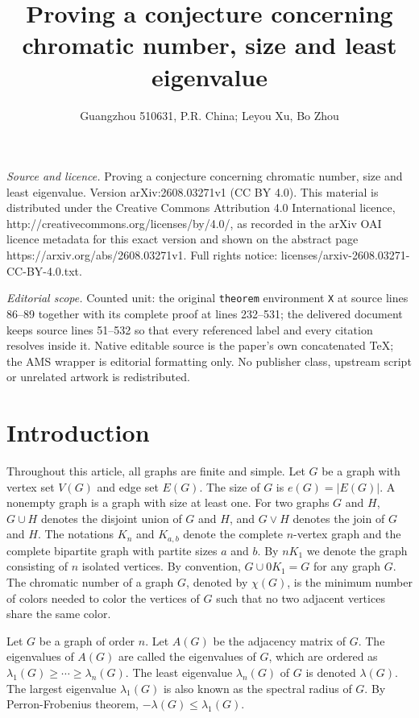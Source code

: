 \documentclass[10pt,a4paper]{amsart}
\begin{document}
\title[Proving a conjecture concerning chromatic number, size and l]{Proving a conjecture concerning chromatic number, size and least eigenvalue}
\author{Guangzhou 510631, P.R. China; Leyou Xu, Bo Zhou}
\date{}
\maketitle
\noindent\emph{Source and licence.} Proving a conjecture concerning chromatic number, size and least eigenvalue. Version arXiv:2608.03271v1 (CC BY 4.0). This material is distributed under the Creative Commons Attribution 4.0 International licence, http://creativecommons.org/licenses/by/4.0/, as recorded in the arXiv OAI licence metadata for this exact version and shown on the abstract page https://arxiv.org/abs/2608.03271v1. Full rights notice: licenses/arxiv-2608.03271-CC-BY-4.0.txt.\par\smallskip
\noindent\textit{Editorial scope.} Counted unit: the original \texttt{theorem} environment \texttt{X} at source lines 86--89 together with its complete proof at lines 232--531; the delivered document keeps source lines 51--532 so that every referenced label and every citation resolves inside it. Native editable source is the paper's own concatenated TeX; the AMS wrapper is editorial formatting only. No publisher class, upstream script or unrelated artwork is redistributed.
\section{Introduction}

Throughout this article, all graphs  are finite and simple. Let $G$ be a graph with vertex set $V(G)$ and edge set $E(G)$. The size of $G$ is $e(G)=|E(G)|$. 
A nonempty graph is a graph with size at least one. For two graphs $G$ and $H$, $G\cup H$ denotes the disjoint union of $G$ and $H$, and $G\vee H$ denotes the join of $G$ and $H$. The notations $K_n$ and $K_{a,b}$ denote the complete $n$-vertex graph and the complete bipartite graph with partite sizes $a$ and $b$. By $nK_1$ we denote the graph consisting of $n$ isolated vertices. By convention, $G\cup 0K_1=G$ for any graph $G$.
The chromatic number of a graph $G$, denoted by $\chi(G)$, is the minimum number of colors needed to color the vertices of $G$ such that no two adjacent vertices share the same color. 

Let $G$ be a graph of order $n$. 
Let $A(G)$ be the adjacency matrix of $G$. The eigenvalues of $A(G)$ are called the eigenvalues of  $G$, which are ordered as $\lambda_1(G)\ge \cdots\ge \lambda_n(G)$.  The least eigenvalue $\lambda_n(G)$ of $G$ is  denoted $\lambda (G)$. The largest eigenvalue $\lambda_1(G)$ is also known as the spectral radius of $G$. By Perron-Frobenius theorem, $-\lambda (G)\le \lambda_1(G)$.
\end{document}
